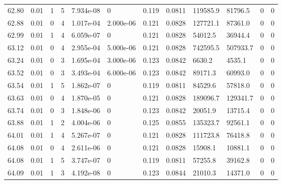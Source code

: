 \documentclass[preview]{standalone}
\begin{document}
{{{{{{{{{{{{{{{{{{\begin{tabular}{L{1.2cm}C{1.2cm} C{0.3cm}C{0.5cm} C{1.4cm}C{1.4cm} C{1.4cm}C{1.4cm} C{1.6cm}C{1.6cm} C{1.6cm}C{1.6cm}}
  62.80  &  0.01  & 1     &  5 &  7.934e-08  & 0  &  0.119&   0.0811& 119585.9 & 81796.5   &  0 & 0  \\ 
  62.88  &  0.01  & 0     &  4 &  1.017e-04  & 2.000e-06  &  0.121&   0.0828& 127721.1 & 87361.0   &  0 & 0  \\ 
  62.99  &  0.01  & 1     &  4 &  6.059e-07  & 0  &  0.121&   0.0828& 54012.5 & 36944.4   &  0 & 0  \\ 
  63.12  &  0.01  & 0     &  4 &  2.955e-04  & 5.000e-06  &  0.121&   0.0828& 742595.5 & 507933.7   &  0 & 0  \\ 
  63.24  &  0.01  & 0     &  3 &  1.695e-04  & 3.000e-06  &  0.123&   0.0842& 6630.2 & 4535.1   &  0 & 0  \\ 
  63.52  &  0.01  & 0     &  3 &  3.493e-04  & 6.000e-06  &  0.123&   0.0842& 89171.3 & 60993.0   &  0 & 0  \\ 
  63.54  &  0.01  & 1     &  5 &  1.862e-07  & 0  &  0.119&   0.0811& 84529.6 & 57818.0   &  0 & 0  \\ 
  63.63  &  0.01  & 0     &  4 &  1.870e-05  & 0  &  0.121&   0.0828& 189096.7 & 129341.7   &  0 & 0  \\ 
  63.74  &  0.01  & 0     &  3 &  1.848e-06  & 0  &  0.123&   0.0842& 20051.9 & 13715.4   &  0 & 0  \\ 
  63.88  &  0.01  & 1     &  2 &  4.004e-06  & 0  &  0.125&   0.0855& 135323.7 & 92561.1   &  0 & 0  \\ 
  64.01  &  0.01  & 1     &  4 &  5.267e-07  & 0  &  0.121&   0.0828& 111723.8 & 76418.8   &  0 & 0  \\ 
  64.08  &  0.01  & 0     &  4 &  2.611e-06  & 0  &  0.121&   0.0828& 15908.1 & 10881.1   &  0 & 0  \\ 
  64.08  &  0.01  & 1     &  5 &  3.747e-07  & 0  &  0.119&   0.0811& 57255.8 & 39162.8   &  0 & 0  \\ 
  64.09  &  0.01  & 1     &  3 &  4.192e-08  & 0  &  0.123&   0.0844& 21010.3 & 14371.0   &  0 & 0  \\ 
\hline 
\end{tabular} 

}}}}}}}}}}}}}}}}}}
\end{document}
